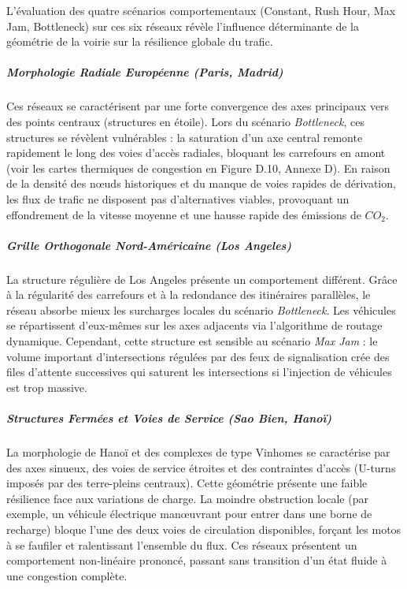 \documentclass[10pt, a4paper]{article}
\begin{document}
L'évaluation des quatre scénarios comportementaux (Constant, Rush Hour,
Max Jam, Bottleneck) sur ces six réseaux révèle l'influence déterminante
de la géométrie de la voirie sur la résilience globale du trafic.

\subparagraph{Morphologie Radiale Européenne (Paris,
Madrid)}\label{morphologie-radiale-europuxe9enne-paris-madrid}

Ces réseaux se caractérisent par une forte convergence des axes
principaux vers des points centraux (structures en étoile). Lors du
scénario \emph{Bottleneck}, ces structures se révèlent vulnérables : la
saturation d'un axe central remonte rapidement le long des voies d'accès
radiales, bloquant les carrefours en amont (voir les cartes thermiques
de congestion en Figure D.10, Annexe D). En raison de la densité des
nœuds historiques et du manque de voies rapides de dérivation, les flux
de trafic ne disposent pas d'alternatives viables, provoquant un
effondrement de la vitesse moyenne et une hausse rapide des émissions de
\(CO_2\).

\subparagraph{Grille Orthogonale Nord-Américaine (Los
Angeles)}\label{grille-orthogonale-nord-amuxe9ricaine-los-angeles}

La structure régulière de Los Angeles présente un comportement
différent. Grâce à la régularité des carrefours et à la redondance des
itinéraires parallèles, le réseau absorbe mieux les surcharges locales
du scénario \emph{Bottleneck}. Les véhicules se répartissent d'eux-mêmes
sur les axes adjacents via l'algorithme de routage dynamique. Cependant,
cette structure est sensible au scénario \emph{Max Jam} : le volume
important d'intersections régulées par des feux de signalisation crée
des files d'attente successives qui saturent les intersections si
l'injection de véhicules est trop massive.

\subparagraph{Structures Fermées et Voies de Service (Sao Bien,
Hanoï)}\label{structures-fermuxe9es-et-voies-de-service-sao-bien-hanouxef}

La morphologie de Hanoï et des complexes de type Vinhomes se caractérise
par des axes sinueux, des voies de service étroites et des contraintes
d'accès (U-turns imposés par des terre-pleins centraux). Cette géométrie
présente une faible résilience face aux variations de charge. La moindre
obstruction locale (par exemple, un véhicule électrique manœuvrant pour
entrer dans une borne de recharge) bloque l'une des deux voies de
circulation disponibles, forçant les motos à se faufiler et ralentissant
l'ensemble du flux. Ces réseaux présentent un comportement non-linéaire
prononcé, passant sans transition d'un état fluide à une congestion
complète.
\end{document}
